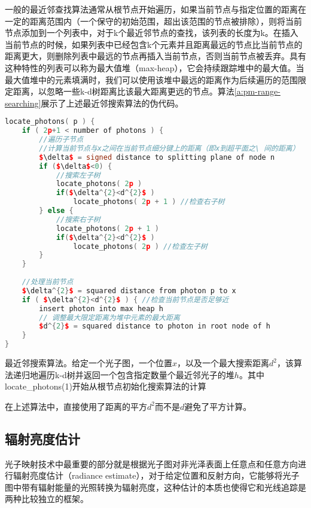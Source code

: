 一般的最近邻查找算法通常从根节点开始遍历，如果当前节点与指定位置的距离在一定的距离范围内（一个保守的初始范围，超出该范围的节点被排除），则将当前节点添加到一个列表中，对于k个最近邻节点的查找，该列表的长度为k。在插入当前节点的时候，如果列表中已经包含k个元素并且距离最远的节点比当前节点的距离更大，则删除列表中最远的节点再插入当前节点，否则当前节点被丢弃。具有这种特性的列表可以称为最大值堆（max-heap），它会持续跟踪堆中的最大值。当最大值堆中的元素填满时，我们可以使用该堆中最远的距离作为后续遍历的范围限定距离，以忽略一些k-d树距离比该最大距离更远的节点。算法\ref{a:pm-range-searching}\cite{a:APracticalGuidetoGlobalIlluminationusingPhotonMaps}展示了上述最近邻搜索算法的伪代码。

\begin{algorithm}
\begin{lstlisting}[language=C++, mathescape]
locate_photons( p ) {
	if ( 2p+1 < number of photons ) { 
		//遍历子节点
		//计算当前节点与x之间在当前节点细分键上的距离（即x到超平面之\ 间的距离）
		$\delta$ = signed distance to splitting plane of node n 
		if ($\delta$<0) {
			//搜索左子树
			locate_photons( 2p ) 
			if($\delta^{2}<d^{2}$ )
				locate_photons( 2p + 1 ) //检查右子树 
		} else {
			//搜索右子树
			locate_photons( 2p + 1 ) 
			if($\delta^{2}<d^{2}$ )
				locate_photons( 2p ) //检查左子树
		}
	}
			
	//处理当前节点
	$\delta^{2}$ = squared distance from photon p to x
	if ( $\delta^{2}<d^{2}$ ) { //检查当前节点是否足够近
		insert photon into max heap h
		// 调整最大限定距离为堆中元素的最大距离
		$d^{2}$ = squared distance to photon in root node of h 
	}
}
\end{lstlisting}
\caption{最近邻搜索算法。给定一个光子图，一个位置$x$，以及一个最大搜索距离$d^{2}$，该算法递归地遍历k-d树并返回一个包含指定数量个最近邻光子的堆$h$。其中locate\_photons(1)开始从根节点初始化搜索算法的计算}
\label{a:pm-range-searching}
\end{algorithm}

在上述算法中，直接使用了距离的平方$d^2$而不是$d$避免了平方计算。





\subsection{辐射亮度估计}\label{sec:pm-radiance-estimate}
光子映射技术中最重要的部分就是根据光子图对非光泽表面上任意点和任意方向进行辐射亮度估计（radiance estimate），对于给定位置和反射方向，它能够将光子图中带有辐射能量的光照转换为辐射亮度，这种估计的本质也使得它和光线追踪是两种比较独立的框架。

